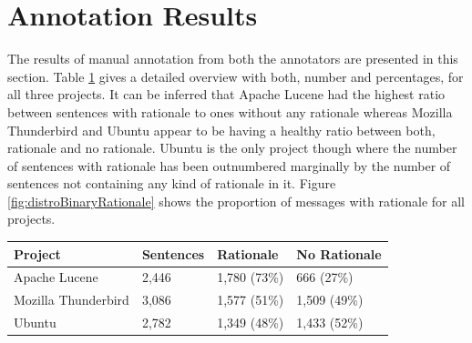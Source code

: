 \documentclass[a4paper,12pt,twoside]{report}
\begin{document}
\section{Annotation Results}
The results of manual annotation from both the annotators are presented in this section. Table \ref{tab:distroBinaryRationale} gives a detailed overview with both, number and percentages, for all three projects. It can be inferred that Apache Lucene had the highest ratio between sentences with rationale to ones without any rationale whereas Mozilla Thunderbird and Ubuntu appear to be having a healthy ratio between both, rationale and no rationale. Ubuntu is the only project though where the number of sentences with rationale has been outnumbered marginally by the number of sentences not containing any kind of rationale in it. Figure \ref{fig:distroBinaryRationale} shows the proportion of messages with rationale for all projects. 
\begin{table} [!htbp] %
    \centering
    \begin{adjustbox}{max width=\columnwidth}
    \def\arraystretch{1} %
    \begin{tabular}{p{4cm} p{4cm} p{4cm} p{4cm}}
        \toprule
        \textbf{Project} & \textbf{Sentences} & \textbf{Rationale} & \textbf{No Rationale}\\
        \midrule
			Apache Lucene & 2,446 & 1,780 (73\%) & 666 (27\%)\\
			Mozilla Thunderbird & 3,086 & 1,577 (51\%) & 1,509 (49\%)\\ 
			Ubuntu & 2,782 & 1,349 (48\%) & 1,433 (52\%)\\
        \midrule
    \end{tabular}
    \end{adjustbox}
    \label{tab:distroBinaryRationale}
\end{table}
\end{document}
